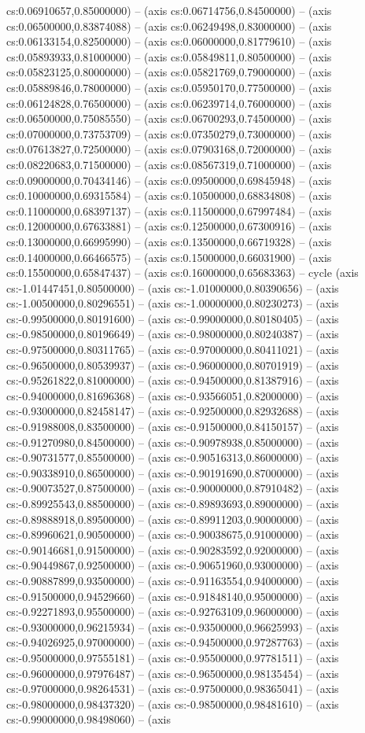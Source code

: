 cs:0.06910657,0.85000000) -- (axis cs:0.06714756,0.84500000) -- (axis cs:0.06500000,0.83874088) -- (axis cs:0.06249498,0.83000000) -- (axis cs:0.06133154,0.82500000) -- (axis cs:0.06000000,0.81779610) -- (axis cs:0.05893933,0.81000000) -- (axis cs:0.05849811,0.80500000) -- (axis cs:0.05823125,0.80000000) -- (axis cs:0.05821769,0.79000000) -- (axis cs:0.05889846,0.78000000) -- (axis cs:0.05950170,0.77500000) -- (axis cs:0.06124828,0.76500000) -- (axis cs:0.06239714,0.76000000) -- (axis cs:0.06500000,0.75085550) -- (axis cs:0.06700293,0.74500000) -- (axis cs:0.07000000,0.73753709) -- (axis cs:0.07350279,0.73000000) -- (axis cs:0.07613827,0.72500000) -- (axis cs:0.07903168,0.72000000) -- (axis cs:0.08220683,0.71500000) -- (axis cs:0.08567319,0.71000000) -- (axis cs:0.09000000,0.70434146) -- (axis cs:0.09500000,0.69845948) -- (axis cs:0.10000000,0.69315584) -- (axis cs:0.10500000,0.68834808) -- (axis cs:0.11000000,0.68397137) -- (axis cs:0.11500000,0.67997484) -- (axis cs:0.12000000,0.67633881) -- (axis cs:0.12500000,0.67300916) -- (axis cs:0.13000000,0.66995990) -- (axis cs:0.13500000,0.66719328) -- (axis cs:0.14000000,0.66466575) -- (axis cs:0.15000000,0.66031900) -- (axis cs:0.15500000,0.65847437) -- (axis cs:0.16000000,0.65683363) -- cycle (axis cs:-1.01447451,0.80500000) -- (axis cs:-1.01000000,0.80390656) -- (axis cs:-1.00500000,0.80296551) -- (axis cs:-1.00000000,0.80230273) -- (axis cs:-0.99500000,0.80191600) -- (axis cs:-0.99000000,0.80180405) -- (axis cs:-0.98500000,0.80196649) -- (axis cs:-0.98000000,0.80240387) -- (axis cs:-0.97500000,0.80311765) -- (axis cs:-0.97000000,0.80411021) -- (axis cs:-0.96500000,0.80539937) -- (axis cs:-0.96000000,0.80701919) -- (axis cs:-0.95261822,0.81000000) -- (axis cs:-0.94500000,0.81387916) -- (axis cs:-0.94000000,0.81696368) -- (axis cs:-0.93566051,0.82000000) -- (axis cs:-0.93000000,0.82458147) -- (axis cs:-0.92500000,0.82932688) -- (axis cs:-0.91988008,0.83500000) -- (axis cs:-0.91500000,0.84150157) -- (axis cs:-0.91270980,0.84500000) -- (axis cs:-0.90978938,0.85000000) -- (axis cs:-0.90731577,0.85500000) -- (axis cs:-0.90516313,0.86000000) -- (axis cs:-0.90338910,0.86500000) -- (axis cs:-0.90191690,0.87000000) -- (axis cs:-0.90073527,0.87500000) -- (axis cs:-0.90000000,0.87910482) -- (axis cs:-0.89925543,0.88500000) -- (axis cs:-0.89893693,0.89000000) -- (axis cs:-0.89888918,0.89500000) -- (axis cs:-0.89911203,0.90000000) -- (axis cs:-0.89960621,0.90500000) -- (axis cs:-0.90038675,0.91000000) -- (axis cs:-0.90146681,0.91500000) -- (axis cs:-0.90283592,0.92000000) -- (axis cs:-0.90449867,0.92500000) -- (axis cs:-0.90651960,0.93000000) -- (axis cs:-0.90887899,0.93500000) -- (axis cs:-0.91163554,0.94000000) -- (axis cs:-0.91500000,0.94529660) -- (axis cs:-0.91848140,0.95000000) -- (axis cs:-0.92271893,0.95500000) -- (axis cs:-0.92763109,0.96000000) -- (axis cs:-0.93000000,0.96215934) -- (axis cs:-0.93500000,0.96625993) -- (axis cs:-0.94026925,0.97000000) -- (axis cs:-0.94500000,0.97287763) -- (axis cs:-0.95000000,0.97555181) -- (axis cs:-0.95500000,0.97781511) -- (axis cs:-0.96000000,0.97976487) -- (axis cs:-0.96500000,0.98135454) -- (axis cs:-0.97000000,0.98264531) -- (axis cs:-0.97500000,0.98365041) -- (axis cs:-0.98000000,0.98437320) -- (axis cs:-0.98500000,0.98481610) -- (axis cs:-0.99000000,0.98498060) -- (axis 